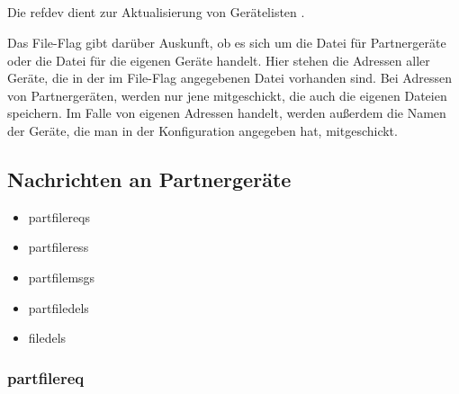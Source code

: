 	\begin{rightwordgroup}{\isprotomsgtype}
	\end{rightwordgroup} \\
	
	\begin{rightwordgroup}{\isprotomsgdata}
		 \\
		 \\
		\skippedwords \\
	\end{rightwordgroup} 
	
Die \gls{refdev} dient zur Aktualisierung von Gerätelisten .
\begin{description}
	Das File-Flag gibt darüber Auskunft, ob es sich um die Datei für Partnergeräte oder die Datei für die eigenen Geräte handelt.
	Hier stehen die Adressen aller Geräte, die in der im File-Flag angegebenen Datei vorhanden sind. Bei Adressen von Partnergeräten, werden nur jene mitgeschickt, die auch die eigenen Dateien speichern. Im Falle von eigenen Adressen handelt, werden außerdem die Namen der Geräte, die man in der Konfiguration angegeben hat, mitgeschickt.
\end{description}

\subsection{Nachrichten an Partnergeräte}
\begin{itemize}
	\item \gls{partfilereq}s
	\item \gls{partfileres}s
	\item \gls{partfilemsg}s
	\item \gls{partfiledel}s
	\item \gls{filedel}s
\end{itemize}

\subsubsection{\gls{partfilereq}} \label{partnerfilerequest}
\messagestart
	\begin{rightwordgroup}{\isprotomsgtype}
	\end{rightwordgroup} \\
	
